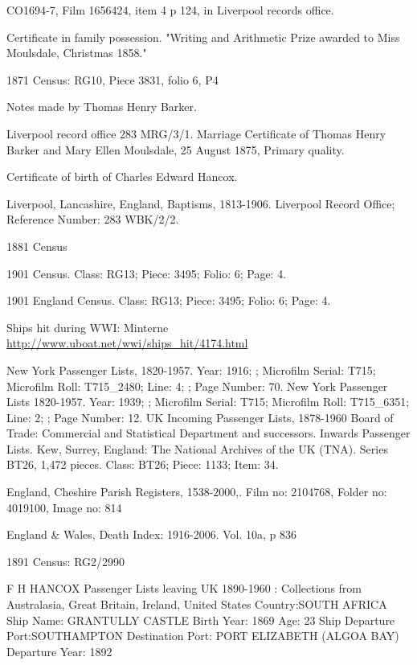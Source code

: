 \begin{thebibliography}{99}
	CO1694-7, Film 1656424, item 4 p 124, in Liverpool records office. 
	
	Certificate in family possession.
	"Writing and Arithmetic Prize awarded to Miss Moulsdale, Christmas 1858."
	
	1871 Census: RG10, Piece 3831, folio 6, P4 
	
	Notes made by Thomas Henry Barker. 
	
	Liverpool record office 283 MRG/3/1.
	Marriage Certificate of Thomas Henry Barker and Mary Ellen Moulsdale, 25 August 1875, Primary quality. 
	
	Certificate of birth of Charles Edward Hancox. 


	Liverpool, Lancashire, England, Baptisms, 1813-1906.
	Liverpool Record Office; Reference Number: 283 WBK/2/2.
	
	1881 Census
	
	1901 Census.
	Class: RG13; Piece: 3495; Folio: 6; Page: 4.
	
	1901 England Census.
	Class: RG13; Piece: 3495; Folio: 6; Page: 4.

	Ships hit during WWI: Minterne
	\url{http://www.uboat.net/wwi/ships_hit/4174.html}

	New York Passenger Lists, 1820-1957.
	Year: 1916; ; Microfilm Serial: T715; Microfilm Roll: T715\_2480; Line: 4; ; Page Number: 70.
	New York Passenger Lists 1820-1957.
	Year: 1939; ; Microfilm Serial: T715; Microfilm Roll: T715\_6351; Line: 2; ; Page Number: 12.
	UK Incoming Passenger Lists, 1878-1960 Board of Trade: Commercial and Statistical Department and successors.
	Inwards Passenger Lists. Kew, Surrey, England: The National Archives of the UK (TNA).
	Series BT26, 1,472 pieces. Class: BT26; Piece: 1133; Item: 34.

	England, Cheshire Parish Registers, 1538-2000,.
	Film no: 2104768, Folder no: 4019100, Image no: 814
	
	England \& Wales, Death Index: 1916-2006.
	Vol. 10a, p 836
	
	 1891 Census: RG2/2990
	 
	F H HANCOX 
   	Passenger Lists leaving UK 1890-1960 : Collections from Australasia, Great Britain, Ireland, United States
	Country:SOUTH AFRICA
	Ship Name: GRANTULLY CASTLE
	Birth Year: 1869  Age: 23
	Ship Departure Port:SOUTHAMPTON
	Destination Port: PORT ELIZABETH (ALGOA BAY)
	Departure Year: 1892
	

\end{thebibliography}

